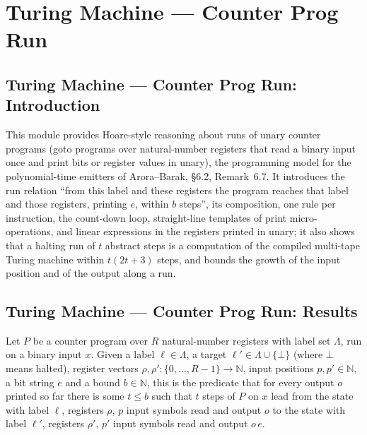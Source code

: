 \section{Turing Machine --- Counter Prog Run}
\subsection*{Turing Machine --- Counter Prog Run: Introduction}

This module provides Hoare-style reasoning about runs of unary counter programs
(goto programs over natural-number registers that read a binary input once and
print bits or register values in unary), the programming model for the
polynomial-time emitters of Arora--Barak, \S6.2, Remark~6.7.  It introduces the
run relation ``from this label and these registers the program reaches that label
and those registers, printing $e$, within $b$ steps'', its composition, one rule
per instruction, the count-down loop, straight-line templates of print
micro-operations, and linear expressions in the registers printed in unary; it
also shows that a halting run of $t$ abstract steps is a computation of the
compiled multi-tape Turing machine within $t(2t+3)$ steps, and bounds the growth
of the input position and of the output along a run.

\subsection*{Turing Machine --- Counter Prog Run: Results}

\begin{definition}
\label{Complexity.CounterProg.Goes}
\leanok
{}
Let $P$ be a counter program over $R$ natural-number registers with label set
$\Lambda$, run on a binary input $x$.  Given a label $\ell \in \Lambda$, a target
$\ell' \in \Lambda \cup \{\bot\}$ (where $\bot$ means halted), register vectors
$\rho, \rho' : \{0,\dots,R-1\} \to \mathbb{N}$, input positions $p, p' \in
\mathbb{N}$, a bit string $e$ and a bound $b \in \mathbb{N}$, this is the
predicate that for every output $o$ printed so far there is some $t \le b$ such
that $t$ steps of $P$ on $x$ lead from the state with label $\ell$, registers
$\rho$, $p$ input symbols read and output $o$ to the state with label $\ell'$,
registers $\rho'$, $p'$ input symbols read and output $o\,e$.
\end{definition}

